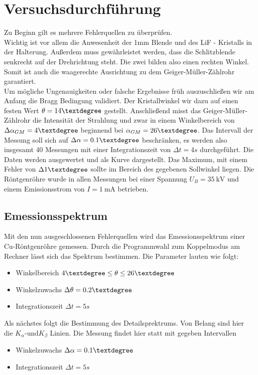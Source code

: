 \section{Versuchsdurchführung}
Zu Beginn gilt es mehrere Fehlerquellen zu überprüfen. \\
Wichtig ist vor allem die Anwesenheit der 1mm Blende und des LiF - Kristalls in der Halterung.
Außerdem muss gewährleistet werden, dass die Schlitzblende senkrecht auf der Drehrichtung steht. Die zwei bilden also einen rechten Winkel.
Somit ist auch die waagerechte Ausrichtung zu dem Geiger-Müller-Zählrohr garantiert. %
\\
\newline
Um mögliche Ungenauigkeiten oder falsche Ergebnisse früh auszuschließen wir am Anfang die Bragg Bedingung %
validiert. Der Kristallwinkel wir dazu auf einen festen Wert $\theta = 14 \textdegree $  gestellt.
Anschließend misst das Geiger-Müller-Zählrohr die Intensität der Strahlung und zwar in einem Winkelbereich von 
$\Delta \alpha_{GM} = 4 \textdegree$ beginnend bei $\alpha_{GM} = 26 \textdegree$. Das Intervall der Messung soll sich 
auf $\Delta \alpha = 0.1 \textdegree$ beschränken, es werden also insgesamt 40 Messungen mit einer Integrationszeit von $\Delta t = 4 \si{s}$ durchgeführt. 
Die Daten werden ausgewertet und als Kurve dargestellt. Das Maximum, mit einem Fehler von $\Delta 1\textdegree$ sollte im Bereich des gegebenen Sollwinkel liegen.
Die Röntgenröhre wurde in allen Messungen bei einer Spannung $U_{B} = \SI{35}{\kilo\volt}$ und einem Emissionsstrom von $I = \SI{1}{\milli\ampere}$ betrieben.
\\
\newline
\subsection{Emessionsspektrum}
Mit den nun ausgeschlossenen Fehlerquellen wird das Emessionsspektrum einer Cu-Röntgenröhre gemessen.
Durch die Programmwahl zum Koppelmodus am Rechner lässt sich das Spektrum bestimmen.
Die Parameter lauten wie folgt:
\begin{itemize}
    \item{Winkelbereich   $4 \textdegree \leq \theta \leq 26 \textdegree $}
    \item{Winkelzuwachs $\Delta \theta = 0.2 \textdegree$}
    \item{Integrationszeit $\Delta t = 5 \si{s}$}
\end{itemize}
Als nächstes folgt die Bestimmung des Detailsprektrums. Von Belang sind hier die $K_{\alpha} \text{-und} K_{\beta}$ Linien. 
Die Messung findet hier statt mit gegeben Intervallen
\begin{itemize}
    \item{Winkelzuwachs $\Delta \alpha = 0.1 \textdegree$}
    \item{Integrationszeit $\Delta t = 5 \si{s}$}
\end{itemize}

